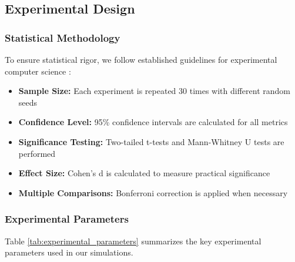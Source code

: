 \documentclass[conference]{IEEEtran}
\begin{document}
\subsection{Experimental Design}

\subsubsection{Statistical Methodology}

To ensure statistical rigor, we follow established guidelines for experimental computer science \cite{jain1991art}:

\begin{itemize}
    \item \textbf{Sample Size:} Each experiment is repeated 30 times with different random seeds
    \item \textbf{Confidence Level:} 95\% confidence intervals are calculated for all metrics
    \item \textbf{Significance Testing:} Two-tailed t-tests and Mann-Whitney U tests are performed
    \item \textbf{Effect Size:} Cohen's d is calculated to measure practical significance
    \item \textbf{Multiple Comparisons:} Bonferroni correction is applied when necessary
\end{itemize}

\subsubsection{Experimental Parameters}

Table \ref{tab:experimental_parameters} summarizes the key experimental parameters used in our simulations.
\end{document}
